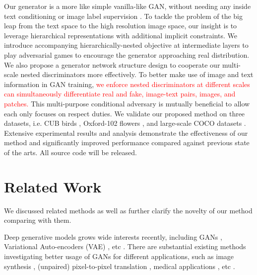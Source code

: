\documentclass[10pt,twocolumn,letterpaper]{article}
\begin{document}
Our generator is a more like simple vanilla-like GAN, without needing any inside text conditioning \cite{han2017stackgan} or image label supervision \cite{dash2017tac}. To tackle the problem of the big leap from the text space to the high resolution image space, our insight is to leverage hierarchical representations with additional implicit constraints. 
We introduce accompanying hierarchically-nested objective at intermediate layers to play adversarial games to encourage the generator approaching real distribution. 
We also propose a generator network structure design to cooperate our multi-scale nested discriminators more effectively.
To better make use of image and text information in GAN training, 
\textcolor{red}{we enforce nested discriminators at different scales can simultaneously differentiate real and fake, image-text pairs, images, and patches.}
This multi-purpose conditional adversary is mutually beneficial to allow each only focuses on respect duties. 
We validate our proposed method on three datasets, i.e. CUB birds \cite{welinder2010caltech}, Oxford-102 flowers \cite{Nilsback08}, and large-scale COCO datasets \cite{lin2014microsoft}. Extensive experimental results and analysis demonstrate the effectiveness of our method and significantly improved performance compared against previous state of the arts. All source code will be released.


\section{Related Work}
We discussed related methods as well as further clarify the novelty of our method comparing with them.

Deep generative models grows wide interests recently, including GANs \cite{goodfellow2014generative}, Variational Auto-encoders (VAE) \cite{kingma2013auto}, etc \cite{oord2016pixel}. 
There are substantial existing methods investigating better usage of GANs for different applications, such as image synthesis \cite{radford2015unsupervised, shrivastava2016learning}, (unpaired) pixel-to-pixel translation \cite{isola2016image,zhu2017unpaired}, medical applications \cite{costa2017towards}, etc \cite{ledig2016photo,huang2016stacked}.
\end{document}
